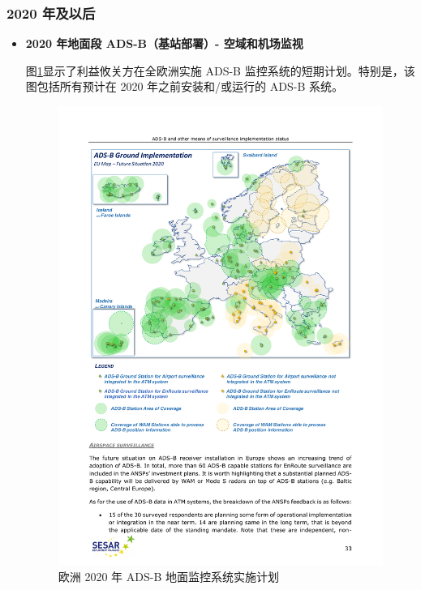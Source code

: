 \subsubsection{2020 年及以后}

\begin{itemize}

    \item \textbf{2020 年地面段 ADS-B（基站部署）- 空域和机场监视}

    图\ref{fig:20180515-sesar-ads-b-report_33}显示了利益攸关方在全欧洲实施 ADS-B 监控系统的短期计划。特别是，该图包括所有预计在 2020 年之前安装和/或运行的 ADS-B 系统。

    \begin{figure}[htbp]
    \centering
    \includegraphics[width=15cm]{pic/20180515-sesar-ads-b-report_33.pdf}
    \caption{欧洲 2020 年 ADS-B 地面监控系统实施计划\protect\footnotemark}
    \label{fig:20180515-sesar-ads-b-report_33}
    \end{figure}


\end{itemize}
